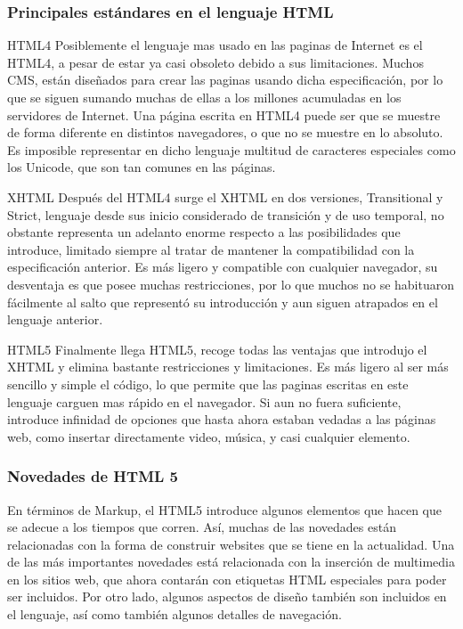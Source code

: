\subsubsection{Principales estándares en el lenguaje HTML}

HTML4
Posiblemente el lenguaje mas usado en las paginas de Internet es el HTML4, a pesar de estar ya casi obsoleto debido a sus limitaciones.
Muchos CMS, están diseñados para crear las paginas usando dicha especificación, por lo que se siguen sumando muchas de ellas a los millones acumuladas en los servidores de Internet.
Una página escrita en HTML4 puede ser que se muestre de forma diferente en distintos navegadores, o que no se muestre en lo absoluto.
Es imposible representar en dicho lenguaje multitud de caracteres especiales como los Unicode, que son tan comunes en las páginas.

XHTML
Después del HTML4 surge el XHTML en dos versiones, Transitional y Strict, lenguaje desde sus inicio considerado de transición y de uso temporal, no obstante representa un adelanto enorme respecto a las posibilidades que introduce, limitado siempre al tratar de mantener la compatibilidad con la especificación anterior. 
Es más ligero y compatible con cualquier navegador, su desventaja es que posee muchas restricciones, por lo que muchos no se habituaron fácilmente al salto que representó su introducción y aun siguen atrapados en el lenguaje anterior.

HTML5
Finalmente llega HTML5, recoge todas las ventajas que introdujo el XHTML y elimina bastante restricciones y limitaciones.
Es más ligero al ser más sencillo y simple el código, lo que permite que las paginas escritas en este lenguaje carguen mas rápido en el navegador.
Si aun no fuera suficiente, introduce infinidad de opciones que hasta ahora estaban vedadas a las páginas web, como insertar directamente video, música, y casi cualquier elemento.

\subsubsection{Novedades de HTML 5}

En términos de Markup, el HTML5 introduce algunos elementos que hacen que se adecue a los tiempos que corren. Así, muchas de las novedades están relacionadas con la forma de construir websites que se tiene en la actualidad. Una de las más importantes novedades está relacionada con la inserción de multimedia en los sitios web, que ahora contarán con etiquetas HTML especiales para poder ser incluidos. Por otro lado, algunos aspectos de diseño también son incluidos en el lenguaje, así como también algunos detalles de navegación.

